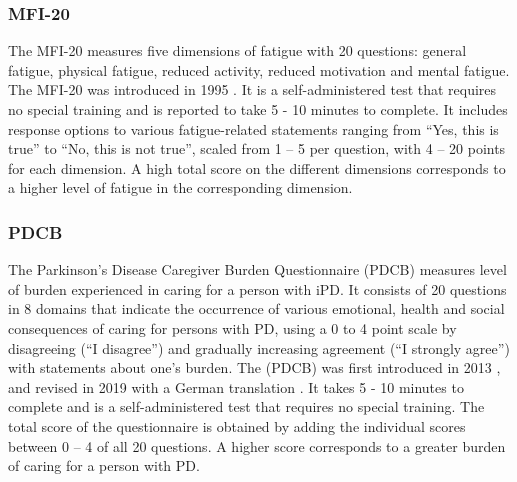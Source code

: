 \QPsychometrics{}

\subsubsection{\acf{MFI-20}}
\label{questionnaires:MFI20}
The \acl{MFI-20} measures five dimensions of fatigue with 20 questions: general fatigue, physical fatigue, reduced activity, reduced motivation and mental fatigue. The \acs{MFI-20} was introduced in 1995 \cite{smets1995mfi20}. It is a self-administered test that requires no special training and is reported to take 5 - 10 minutes to complete. It includes response options to various fatigue-related statements ranging from ``Yes, this is true'' to ``No, this is not true'', scaled from 1 -- 5 per question, with 4 -- 20 points for each dimension. A high total score on the different dimensions corresponds to a higher level of fatigue in the corresponding dimension.

\QPsychometrics{}

\subsubsection{\acf{PDCB}}
\label{questionnaires:PDCB}
The Parkinson's Disease Caregiver Burden Questionnaire (\acs{PDCB}) measures level of burden experienced in caring for a person with \ac{iPD}. It consists of 20 questions in 8 domains that indicate the occurrence of various emotional, health and social consequences of caring for persons with \ac{PD}, using a 0 to 4 point scale by disagreeing (``I disagree'') and gradually increasing agreement (``I strongly agree'') with statements about one's burden. The (\acs{PDCB}) was first introduced in 2013 \cite{zhong2013pdcb}, and revised in 2019 with a German translation \cite{klietz2019pdcb}. It takes 5 - 10 minutes to complete and is a self-administered test that requires no special training. The total score of the questionnaire is obtained by adding the individual scores between 0 -- 4 of all 20 questions. A higher score corresponds to a greater burden of caring for a person with \ac{PD}.

\QPsychometrics{}

